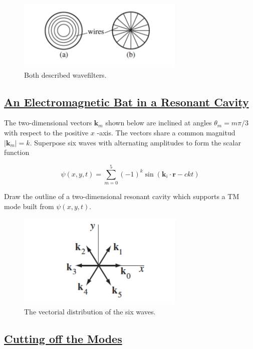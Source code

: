 \begin{figure}[h]
	\includegraphics[width=8cm]{figures/2waveguides.png}
	\centering
	\caption{Both described wavefilters.}
\end{figure}

\subsection{\hyperref[An Electromagnetic Bat in a Resonant Cavity]{An Electromagnetic Bat in a Resonant Cavity}}

The two-dimensional vectors $\mathbf{k}_{m}$ shown below are inclined at angles $\theta_{m}=m \pi / 3$ with respect to the positive $x$ -axis. The vectors share a common magnitud $\left|\mathbf{k}_{m}\right|=k$.
Superpose six waves with alternating amplitudes to form the scalar function

\begin{equation}
	\psi(x, y, t)=\sum_{m=0}^{5}(-1)^{k} \sin \left(\mathbf{k}_{i} \cdot \mathbf{r}-c k t\right)
\end{equation}

Draw the outline of a two-dimensional resonant cavity which supports a TM mode built from $\psi(x, y, t)$.

\begin{figure}[h]
	\includegraphics[width=8cm]{figures/6waves.png}
	\centering
	\caption{The vectorial distribution of the six waves.}
\end{figure}

\subsection{\hyperref[Cutting off the modes]{Cutting off the Modes}}

